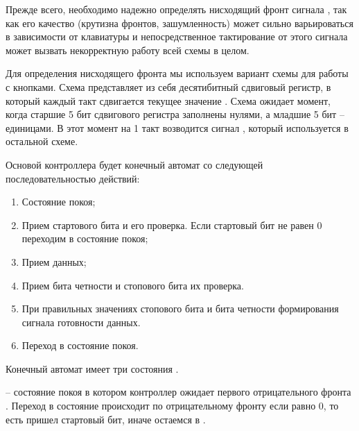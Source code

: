 \par{Прежде всего, необходимо надежно определять нисходящий фронт сигнала , так как его качество (крутизна фронтов, зашумленность) может сильно варьироваться в зависимости от клавиатуры и непосредственное тактирование от этого сигнала может вызвать некорректную работу всей схемы в целом.}

\par{Для определения нисходящего фронта мы используем вариант схемы для работы с кнопками. Схема представляет из себя десятибитный сдвиговый регистр, в который каждый такт  сдвигается текущее значение . Схема ожидает момент, когда старшие 5 бит сдвигового регистра заполнены нулями, а младшие 5 бит -- единицами. В этот момент на 1 такт возводится сигнал , который используется в остальной схеме.}




\par{Основой контроллера будет конечный автомат со следующей последовательностью действий:}
  \begin{enumerate}[noitemsep,topsep=0pt, after=\vspace{2pt}]
    \item Состояние покоя;
    \item Прием стартового бита и его проверка. Если стартовый бит не равен 0 переходим в состояние покоя;
    \item Прием данных;
    \item Прием бита четности и стопового бита их проверка.
    \item При правильных значениях стопового бита и бита четности формирования сигнала готовности данных.
    \item Переход в состояние покоя.
  \end{enumerate}



\par{Конечный автомат имеет три состояния .}

\par{ – состояние покоя в котором контроллер ожидает первого отрицательного фронта . Переход в состояние  происходит по отрицательному фронту  если  равно 0, то есть пришел стартовый бит, иначе остаемся в .}

